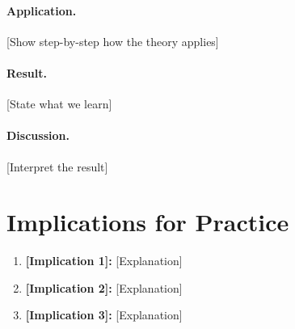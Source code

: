 \paragraph{Application.} [Show step-by-step how the theory applies]

\paragraph{Result.} [State what we learn]

\paragraph{Discussion.} [Interpret the result]


\section{Implications for Practice}
\label{sec:[code]-practice}


\begin{tcolorbox}[colback=green!5!white, colframe=green!75!black, 
    title=Practical Implications]
\begin{enumerate}
\item \textbf{[Implication 1]:} [Explanation]
\item \textbf{[Implication 2]:} [Explanation]
\item \textbf{[Implication 3]:} [Explanation]
\end{enumerate}
\end{tcolorbox}


%

%
%

%
%
%


